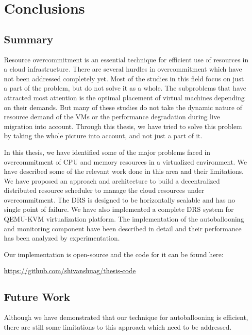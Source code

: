 \chapter{Conclusions}
\label{chap:conclusions}

\section{Summary}
Resource overcommitment is an essential technique for efficient use of resources in a cloud infrastructure. There are several hurdles in overcommitment which have not been addressed completely yet. Most of the studies in this field focus on just a part of the problem, but do not solve it as a whole. The subproblems that have attracted most attention is the optimal placement of virtual machines depending on their demands. But many of these studies do not take the dynamic nature of resource demand of the VMs or the performance degradation during live migration into account. Through this thesis, we have tried to solve this problem by taking the whole picture into account, and not just a part of it.

In this thesis, we have identified some of the major problems faced in overcommitment of CPU and memory resources in a virtualized environment. We have described some of the relevant work done in this area and their limitations. We have proposed an approach and architecture to build a decentralized distributed resource scheduler to manage the cloud resources under overcommitment. The DRS is designed to be horizontally scalable and has no single point of failure. We have also implemented a complete DRS system for QEMU-KVM virtualization platform. The implementation of the autoballooning and monitoring component have been described in detail and their performance has been analyzed by experimentation.

Our implementation is open-source and the code for it can be found here:
\begin{center}
\url{https://github.com/shivanshuag/thesis-code}
\end{center}

\section{Future Work}
Although we have demonstrated that our technique for autoballooning is efficient, there are still some limitations to this approach which need to be addressed. 

